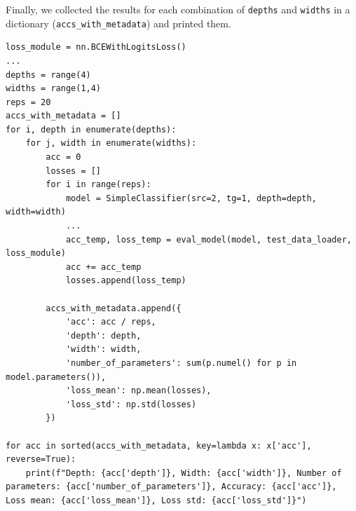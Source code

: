 \begin{enumerate}
Finally, we collected the results for each combination of \lstinline|depths| and \lstinline|widths| in a dictionary (\lstinline|accs_with_metadata|) and printed them.
\begin{lstlisting}
loss_module = nn.BCEWithLogitsLoss()
...
depths = range(4)
widths = range(1,4)
reps = 20
accs_with_metadata = []
for i, depth in enumerate(depths):
    for j, width in enumerate(widths):
        acc = 0
        losses = []
        for i in range(reps):
            model = SimpleClassifier(src=2, tg=1, depth=depth, width=width)
            ...
            acc_temp, loss_temp = eval_model(model, test_data_loader, loss_module)
            acc += acc_temp
            losses.append(loss_temp)
                        
        accs_with_metadata.append({
            'acc': acc / reps,
            'depth': depth,
            'width': width,
            'number_of_parameters': sum(p.numel() for p in model.parameters()),
            'loss_mean': np.mean(losses),
            'loss_std': np.std(losses)
        })
        
for acc in sorted(accs_with_metadata, key=lambda x: x['acc'], reverse=True):
    print(f"Depth: {acc['depth']}, Width: {acc['width']}, Number of parameters: {acc['number_of_parameters']}, Accuracy: {acc['acc']}, Loss mean: {acc['loss_mean']}, Loss std: {acc['loss_std']}")

\end{lstlisting}
\end{enumerate}

